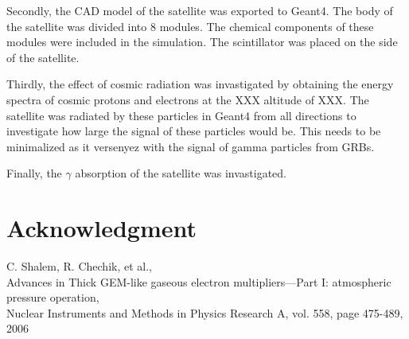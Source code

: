 \documentclass[12pt, a4paper,titlepage]{article}
\numberwithin{equation}{section}
\numberwithin{figure}{section}
\begin{document}
Secondly, the CAD model of the satellite was exported to Geant4. The body of the satellite was divided into 8 modules. The chemical components of these modules were included in the simulation. The scintillator was placed on the side of the satellite.

Thirdly, the effect of cosmic radiation was invastigated by obtaining the energy spectra of cosmic protons and electrons at the XXX altitude of XXX. The satellite was radiated by these particles in Geant4 from all directions to investigate how large the signal of these particles would be. This needs to be minimalized as it versenyez with the signal of gamma particles from GRBs.

Finally, the $\gamma$ absorption of the satellite was invastigated.

\pagebreak

\section{Acknowledgment}

 
\pagebreak

\begin{thebibliography}{99}

 C. Shalem, R. Chechik, et al.,\\
Advances in Thick GEM-like gaseous electron multipliers—Part I: atmospheric pressure operation,\\
Nuclear Instruments and Methods in Physics Research A, vol. 558, page 475-489, 2006

\end{thebibliography}

\pagebreak
\end{document}
